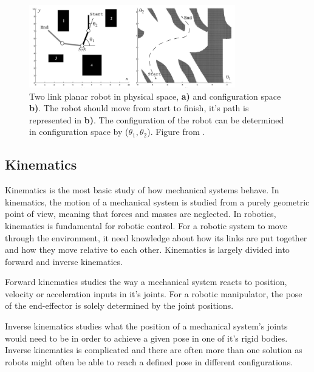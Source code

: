 \begin{figure}[htp]
  \centering
  \includegraphics[width = 0.8\textwidth]{Figures/figConfSpace.pdf}
  \caption{Two link planar robot in physical space, \textbf{a)} and configuration space \textbf{b)}. The robot should move from start to finish, it's path is represented in \textbf{b)}. The configuration of the robot can be determined in configuration space by ($\theta_1, \theta_2$). Figure from \cite{SiegwartRoland2011Itam}.}
  \label{fig:T:RC:CSpace}
\end{figure}

\subsection{Kinematics}
Kinematics is the most basic study of how mechanical systems behave\cite{SiegwartRoland2011Itam}. In kinematics, the motion of a mechanical system is studied from a purely geometric point of view, meaning that forces and masses are neglected. In robotics, kinematics is fundamental for robotic control. For a robotic system to move through the environment, it need knowledge about how its links are put together and how they move relative to each other. Kinematics is largely divided into forward and inverse kinematics. 

Forward kinematics studies the way a mechanical system reacts to position, velocity or acceleration inputs in it's joints. For a robotic manipulator, the pose of the end-effector is solely determined by the joint positions. 

Inverse kinematics studies what the position of a mechanical system's joints would need to be in order to achieve a given pose in one of it's rigid bodies. Inverse kinematics is complicated and there are often more than one solution as robots might often be able to reach a defined pose in different configurations.


